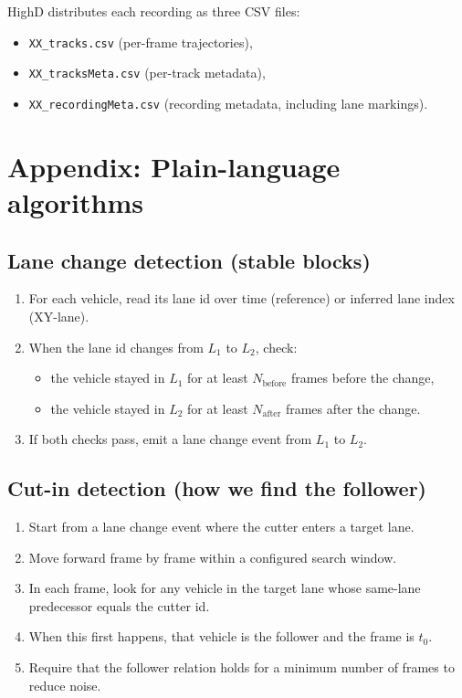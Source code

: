 \documentclass[12pt,a4paper,twoside,openright]{report}
\begin{document}
    HighD distributes each recording as three CSV files:
    \begin{itemize}[leftmargin=1.2em]
  \item \texttt{XX\_tracks.csv} (per-frame trajectories),
  \item \texttt{XX\_tracksMeta.csv} (per-track metadata),
  \item \texttt{XX\_recordingMeta.csv} (recording metadata, including lane markings).
    \end{itemize}

    \chapter{Appendix: Plain-language algorithms}

    \section{Lane change detection (stable blocks)}
    \begin{enumerate}[leftmargin=1.6em]
  \item For each vehicle, read its lane id over time (reference) or inferred lane index (XY-lane).
  \item When the lane id changes from $L_1$ to $L_2$, check:
  \begin{itemize}[leftmargin=1.2em]
    \item the vehicle stayed in $L_1$ for at least $N_\text{before}$ frames before the change,
    \item the vehicle stayed in $L_2$ for at least $N_\text{after}$ frames after the change.
  \end{itemize}
  \item If both checks pass, emit a lane change event from $L_1$ to $L_2$.
    \end{enumerate}

    \section{Cut-in detection (how we find the follower)}
    \begin{enumerate}[leftmargin=1.6em]
  \item Start from a lane change event where the cutter enters a target lane.
  \item Move forward frame by frame within a configured search window.
  \item In each frame, look for any vehicle in the target lane whose same-lane predecessor equals the cutter id.
  \item When this first happens, that vehicle is the follower and the frame is $t_0$.
  \item Require that the follower relation holds for a minimum number of frames to reduce noise.
    \end{enumerate}
\end{document}
